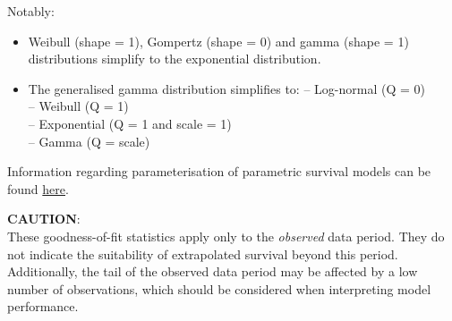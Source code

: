 \documentclass[
]{article}
\providecommand{\tightlist}{%
  \setlength{\itemsep}{0pt}\setlength{\parskip}{0pt}}
\begin{document}
Notably:

\begin{itemize}
\tightlist
\item
  Weibull (shape = 1), Gompertz (shape = 0) and gamma (shape = 1)
  distributions simplify to the exponential distribution.\\
\item
  The generalised gamma distribution simplifies to: -- Log-normal (Q =
  0)\\
  -- Weibull (Q = 1)\\
  -- Exponential (Q = 1 and scale = 1)\\
  -- Gamma (Q = scale)
\end{itemize}

Information regarding parameterisation of parametric survival models can
be found
\href{https://devinincerti.com/code/survival-distributions.html}{here}.

\textbf{CAUTION}:\\
These goodness-of-fit statistics apply only to the \emph{observed} data
period. They do not indicate the suitability of extrapolated survival
beyond this period. Additionally, the tail of the observed data period
may be affected by a low number of observations, which should be
considered when interpreting model performance.

\clearpage

\begin{table}[H]
\centering
\caption{\label{tab:Table_2}Goodness of fit statistics}
\centering
{}
\end{table}
\end{document}
